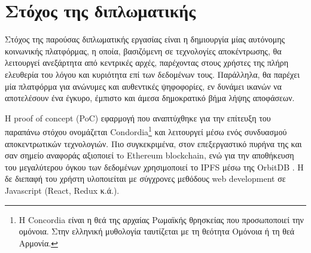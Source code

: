 \section{Στόχος της διπλωματικής}

Στόχος της παρούσας διπλωματικής εργασίας είναι η δημιουργία μίας αυτόνομης κοινωνικής πλατφόρμας, η οποία, βασιζόμενη σε τεχνολογίες αποκέντρωσης, θα λειτουργεί ανεξάρτητα από κεντρικές αρχές, παρέχοντας στους χρήστες της πλήρη ελευθερία του λόγου και κυριότητα επί των δεδομένων τους. Παράλληλα, θα παρέχει μία πλατφόρμα για ανώνυμες και αυθεντικές ψηφοφορίες, εν δυνάμει ικανών να αποτελέσουν ένα έγκυρο, έμπιστο και άμεσα δημοκρατικό βήμα λήψης αποφάσεων.

Η proof of concept (PoC) εφαρμογή που αναπτύχθηκε για την επίτευξη του παραπάνω στόχου ονομάζεται Condordia\footnote{Η Concordia είναι η θεά της αρχαίας Ρωμαϊκής θρησκείας που προσωποποιεί την ομόνοια. Στην ελληνική μυθολογία ταυτίζεται με τη θεότητα Ομόνοια ή τη θεά Αρμονία.} και λειτουργεί μέσω ενός συνδυασμού αποκεντρωτικών τεχνολογιών. Πιο συγκεκριμένα, στον επεξεργαστικό πυρήνα της και σαν σημείο αναφοράς αξιοποιεί τo Ethereum blockchain, ενώ για την αποθήκευση του μεγαλύτερου όγκου των δεδομένων χρησιμοποιεί το IPFS μέσω της OrbitDB . Η δε διεπαφή του χρήστη υλοποιείται με σύγχρονες μεθόδους web development σε Javascript (React, Redux κ.ά.).
